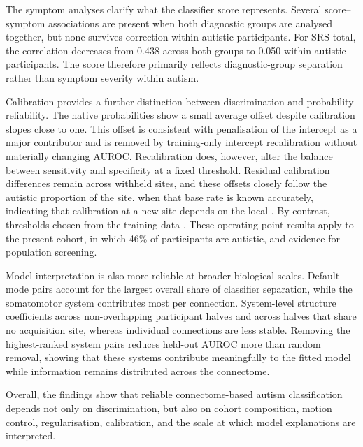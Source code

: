 The symptom analyses clarify what the classifier score represents. Several score--symptom associations are present when both diagnostic groups are analysed together, but none survives correction within autistic participants. For SRS total, the correlation decreases from 0.438 across both groups to 0.050 within autistic participants. The score therefore primarily reflects diagnostic-group separation rather than symptom severity within autism.

Calibration provides a further distinction between discrimination and probability reliability. The native probabilities show a small average offset despite calibration slopes close to one. This offset is consistent with penalisation of the intercept as a major contributor and is removed by training-only intercept recalibration without materially changing AUROC. Recalibration does, however, alter the balance between sensitivity and specificity at a fixed threshold. Residual calibration differences remain across withheld sites, and these offsets closely follow the autistic proportion of the site.  when that base rate is known accurately, indicating that calibration at a new site depends on the local . By contrast, thresholds chosen from the training data . These operating-point results apply to the present cohort, in which 46\% of participants are autistic, and  evidence for population screening.

Model interpretation is also more reliable at broader biological scales. Default-mode pairs account for the largest overall share of classifier separation, while the somatomotor system contributes most per connection. System-level structure coefficients  across non-overlapping participant halves and across halves that share no acquisition site, whereas individual connections are less stable. Removing the highest-ranked system pairs reduces held-out AUROC more than random removal, showing that these systems contribute meaningfully to the fitted model while information remains distributed across the connectome.

Overall, the findings show that reliable connectome-based autism classification depends not only on discrimination, but also on cohort composition, motion control, regularisation, calibration, and the scale at which model explanations are interpreted.


